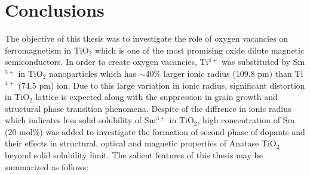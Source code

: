 \documentclass[main.tex]{subfiles}
\begin{document}
\chapter{Conclusions}

\thispagestyle{empty}

\pagestyle{fancy}
\fancyhf{}

\lhead{\chaptername \ \thechapter}

The objective of this thesis was to investigate the role of oxygen vacancies on ferromagnetism in TiO$_{2}$ which is one of the most promising oxide dilute magnetic semiconductors. In order to create oxygen vacancies, Ti$^{4+}$ was substituted by Sm$^{3+}$ in TiO$_{2}$ nanoparticles which has $\sim$40$\%$ larger ionic radius (109.8 pm) than Ti$^{4+}$ (74.5 pm) ion. Due to this large variation in ionic radius, significant distortion in TiO$_{2}$ lattice is expected along with the suppression in grain growth and structural phase transition phenomena. Despite of the diffrence in ionic radius which indicates less solid solubility of Sm$^{3+}$ in TiO$_{2}$, high concentration of Sm (20 mol$\%$) was added to investigate the formation of second phase of dopants and their effects in structural, optical and magnetic properties of Anatase TiO$_{2}$ beyond solid solubility limit. The salient features of this thesis may be summarized as follows: \\
\end{document}
